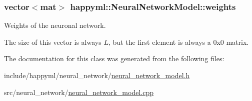 \subsubsection[{\texorpdfstring{weights}{weights}}]{\setlength{\rightskip}{0pt plus 5cm}vector$<$mat$>$ happyml\+::\+Neural\+Network\+Model\+::weights\hspace{0.3cm}{\ttfamily [protected]}}\hypertarget{classhappyml_1_1NeuralNetworkModel_a84c347de105f8a0fcf6907cee7e8200d}{}\label{classhappyml_1_1NeuralNetworkModel_a84c347de105f8a0fcf6907cee7e8200d}


Weights of the neuronal network. 

The size of this vector is always $L$, but the first element is always a 0x0 matrix. 

The documentation for this class was generated from the following files\+:\begin{DoxyCompactItemize}
\item 
include/happyml/neural\+\_\+network/\hyperlink{neural__network__model_8h}{neural\+\_\+network\+\_\+model.\+h}\item 
src/neural\+\_\+network/\hyperlink{neural__network__model_8cpp}{neural\+\_\+network\+\_\+model.\+cpp}\end{DoxyCompactItemize}
